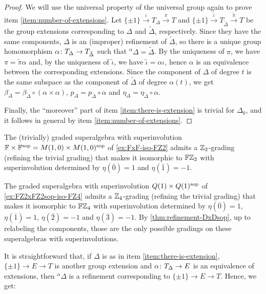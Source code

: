 \begin{proof}
	We will use the universal property of the universal group again to prove item \eqref{item:number-of-extensions}.
	Let $\{ \pm 1 \} \xrightarrow{\iota} T_\Delta \xrightarrow{\pi} T$ and $\{ \pm 1 \} \xrightarrow{\tilde\iota} T_{\tilde \Delta} \xrightarrow{\tilde\pi} T$ be the group extensions corresponding to $\Delta$ and $\tilde\Delta$, respectively. 
	Since they have the same components, $\Delta$ is an (improper) refinement of $\tilde\Delta$, so there is a unique group homomorphism $\alpha\colon T_\Delta \to T_{\tilde \Delta}$ such that ${}^\alpha \Delta = \tilde\Delta$. 
	By the uniqueness of $\pi$, we have $\pi = \tilde\pi \alpha$ and, by the uniqueness of $\tilde\iota$, we have $\tilde\iota = \alpha \iota$, hence $\alpha$ is an equivalence between the corresponding extensions. 
	Since the component of $\Delta$ of degree $t$ is the same subspace as the component of $\tilde\Delta$ of degree $\alpha(t)$, we get $\beta_\Delta = \beta_{\tilde\Delta} \circ (\alpha \times \alpha)$, $p_\Delta = p_{\tilde\Delta} \circ \alpha$ and $\eta_\Delta = \eta_{\tilde\Delta} \circ \alpha$. 
	
	Finally, the ``moreover'' part of item \eqref{item:there-is-extension} is trivial for $\Delta_0$, and it follows in general by item \eqref{item:number-of-extensions}.
\end{proof}

\begin{ex}\label{ex:now-FZ2-is-division}
    The (trivially) graded superalgebra with superinvolution $\mathbb{F} \times \mathbb{F}^{\mathrm{sop}} = M(1,0) \times M(1,0)^{\mathrm{sop}}$ of \cref{ex:FxF-iso-FZ2} admits a $\mathbb{Z}_2$-grading (refining the trivial grading) that makes it isomorphic to $\mathbb{F}\mathbb{Z}_2$ with superinvolution determined by $\eta(\bar 0) = 1$ and $\eta(\bar 1) = -1$. 
\end{ex}

\begin{ex}\label{ex:now-FZ4-is-division}
    The graded superalgebra with superinvolution $Q(1) \times Q(1)^{\mathrm{sop}}$ of \cref{ex:FZ2xFZ2sop-iso-FZ4} 
    admits a $\mathbb{Z}_4$-grading (refining the trivial grading) that makes it isomorphic to $\mathbb{F}\mathbb{Z}_4$ with superinvolution determined by $\eta(\bar 0) = 1$, $\eta(\bar 1) = 1$, $\eta(\bar 2) = -1$ and $\eta(\bar 3) = -1$. 
    By \cref{thm:refinement-DxDsop}, up to relabeling the components, those are the only possible gradings on these superalgebras with superinvolutions. 
\end{ex}

It is straightforward that, if $\Delta$ is as in item \eqref{item:there-is-extension},  $\{ \pm 1 \} \rightarrow E \rightarrow T$ is another group extension and $\alpha\colon T_\Delta \to E$ is an equivalence of extensions, then ${}^\alpha \Delta$ is a refinement corresponding to $\{ \pm 1 \} \rightarrow E \rightarrow T$. 
Hence, we get:

